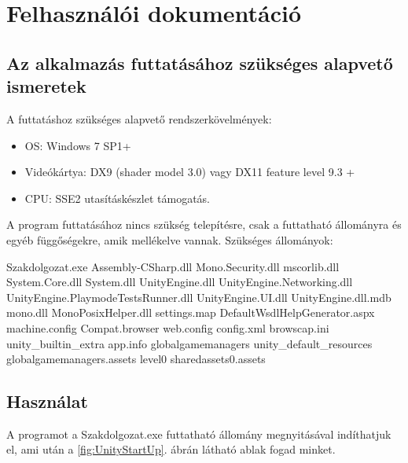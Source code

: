 \chapter*{Felhasználói dokumentáció}

\section*{Az alkalmazás futtatásához szükséges alapvető ismeretek}

A futtatáshoz szükséges alapvető rendszerkövelmények:
\begin{itemize}
\item OS: Windows 7 SP1+
\item Videókártya: DX9 (shader model 3.0) vagy DX11 feature level 9.3 +
\item CPU: SSE2 utasításkészlet  támogatás.
\end{itemize}

\noindent A program futtatásához nincs szükség telepítésre, csak a futtatható állományra és egyéb függőségekre, amik mellékelve vannak.
\newline
\newline Szükséges állományok:
\begin{cpp}
Szakdolgozat.exe Assembly-CSharp.dll Mono.Security.dll mscorlib.dll
System.Core.dll System.dll UnityEngine.dll UnityEngine.Networking.dll
UnityEngine.PlaymodeTestsRunner.dll UnityEngine.UI.dll
UnityEngine.dll.mdb mono.dll MonoPosixHelper.dll settings.map
DefaultWsdlHelpGenerator.aspx machine.config Compat.browser
web.config config.xml browscap.ini  unity\_builtin\_extra app.info 
globalgamemanagers unity\_default\_resources
globalgamemanagers.assets level0 sharedassets0.assets
\end{cpp}

\section*{Használat}
A programot a Szakdolgozat.exe futtatható állomány megnyitásával indíthatjuk el, ami után a \ref{fig:UnityStartUp}. ábrán látható ablak fogad minket.

